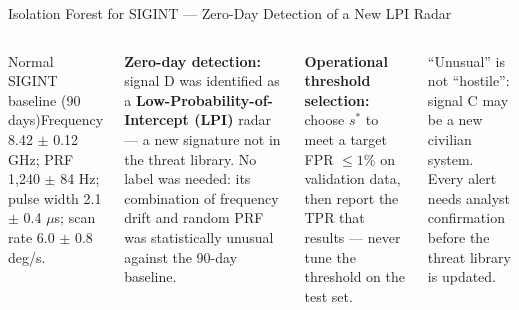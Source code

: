 \documentclass[aspectratio=169,10pt,t]{beamer}
\begin{document}
\begin{frame}{Isolation Forest for SIGINT --- Zero-Day Detection of a New LPI Radar}
\begin{columns}[T]
\begin{cbox}[ISSAnavy]{Normal SIGINT baseline (90 days)}\scriptsize Frequency 8.42 $\pm$ 0.12 GHz; PRF 1,240 $\pm$ 84 Hz; pulse width 2.1 $\pm$ 0.4 $\mu$s; scan rate 6.0 $\pm$ 0.8 deg/s.\end{cbox}
\begin{rbox}\scriptsize\textbf{Zero-day detection:} signal D was identified as a \textbf{Low-Probability-of-Intercept (LPI)} radar --- a new signature not in the threat library. No label was needed: its combination of frequency drift and random PRF was statistically unusual against the 90-day baseline.\end{rbox}
\begin{ibox}\scriptsize\textbf{Operational threshold selection:} choose $s^{*}$ to meet a target FPR $\le1\%$ on validation data, then report the TPR that results --- never tune the threshold on the test set.\end{ibox}
\begin{wbox}\scriptsize ``Unusual'' is not ``hostile'': signal C may be a new civilian system. Every alert needs analyst confirmation before the threat library is updated.\end{wbox}
\end{columns}
\end{frame}
\end{document}
